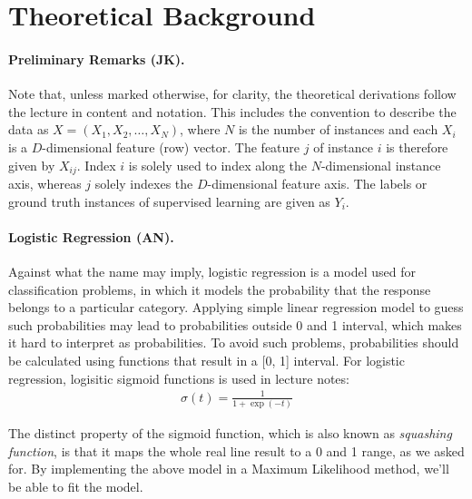 \documentclass[12pt, a4paper]{scrartcl}
\begin{document}
\section{Theoretical Background}	
\label{sec:theo}

\paragraph{Preliminary Remarks (JK).} Note that, unless marked otherwise, for clarity, the theoretical derivations follow the lecture \cite{kothe2018foml} in content and notation.
This includes the convention to describe the data as $X = ( X_1, X_2, \dots, X_N)$, where $N$ is the number of instances and each $X_i$ is a $D$-dimensional feature (row) vector. The feature $j$ of instance $i$ is therefore given by $X_{ij}$.  Index $i$ is solely used to index along the $N$-dimensional instance axis, whereas $j$ solely indexes the $D$-dimensional feature axis. The labels or ground truth instances of supervised learning are given as $Y_i$.


\paragraph{Logistic Regression (AN). }  Against what the name may imply, logistic regression is a model used for classification problems, in which it models the probability that the response belongs to a particular category. Applying simple linear regression model to guess such probabilities may lead to probabilities outside 0 and 1 interval, which makes it hard to interpret as probabilities.
To avoid such problems, probabilities should be calculated using functions that result in a [0, 1] interval. For logistic regression, logisitic sigmoid functions is used in lecture notes:
\begin{align}
	\sigma(t) = \frac{1}{1 + \exp(-t)}
\end{align}

The distinct property of the sigmoid function, which is also known as \emph{squashing function}, is that it maps the whole real line result to a 0 and 1 range, as we asked for. By implementing the above model in a Maximum Likelihood method, we'll be able to fit the model.
\end{document}
